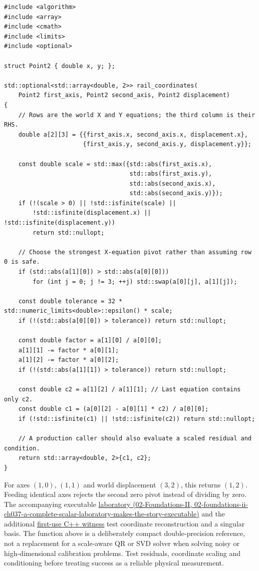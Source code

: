 \begin{verbatim}
#include <algorithm>
#include <array>
#include <cmath>
#include <limits>
#include <optional>

struct Point2 { double x, y; };

std::optional<std::array<double, 2>> rail_coordinates(
    Point2 first_axis, Point2 second_axis, Point2 displacement)
{
    // Rows are the world X and Y equations; the third column is their RHS.
    double a[2][3] = {{first_axis.x, second_axis.x, displacement.x},
                      {first_axis.y, second_axis.y, displacement.y}};

    const double scale = std::max({std::abs(first_axis.x),
                                   std::abs(first_axis.y),
                                   std::abs(second_axis.x),
                                   std::abs(second_axis.y)});
    if (!(scale > 0) || !std::isfinite(scale) ||
        !std::isfinite(displacement.x) || !std::isfinite(displacement.y))
        return std::nullopt;

    // Choose the strongest X-equation pivot rather than assuming row 0 is safe.
    if (std::abs(a[1][0]) > std::abs(a[0][0]))
        for (int j = 0; j != 3; ++j) std::swap(a[0][j], a[1][j]);

    const double tolerance = 32 * std::numeric_limits<double>::epsilon() * scale;
    if (!(std::abs(a[0][0]) > tolerance)) return std::nullopt;

    const double factor = a[1][0] / a[0][0];
    a[1][1] -= factor * a[0][1];
    a[1][2] -= factor * a[0][2];
    if (!(std::abs(a[1][1]) > tolerance)) return std::nullopt;

    const double c2 = a[1][2] / a[1][1]; // Last equation contains only c2.
    const double c1 = (a[0][2] - a[0][1] * c2) / a[0][0];
    if (!std::isfinite(c1) || !std::isfinite(c2)) return std::nullopt;

    // A production caller should also evaluate a scaled residual and condition.
    return std::array<double, 2>{c1, c2};
}
\end{verbatim}

For axes \((1,0)\), \((1,1)\) and world displacement \((3,2)\), this returns \((1,2)\). Feeding identical axes rejects the second zero pivot instead of dividing by zero. The accompanying executable \href{../02-Foundations-II/main.pdf\#nameddest=02-foundations-ii-ch037-a-complete-scalar-laboratory-makes-the-story-executable}{laboratory (02-Foundations-II, 02-foundations-ii-ch037-a-complete-scalar-laboratory-makes-the-story-executable)} and the additional \hyperref[source-file-a41016f2e326b40cdff18ff4]{first-use C++ witness} test coordinate reconstruction and a singular basis. The function above is a deliberately compact double-precision reference, not a replacement for a scale-aware QR or SVD solver when solving noisy or high-dimensional calibration problems. Test residuals, coordinate scaling and conditioning before treating success as a reliable physical measurement.

